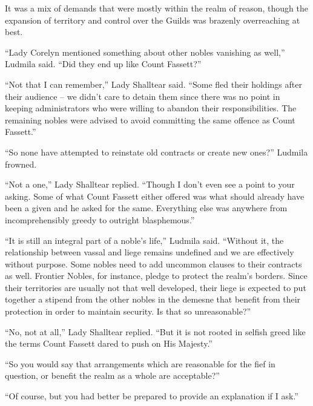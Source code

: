  

It was a mix of demands that were mostly within the realm of reason, though the expansion of territory and control over the Guilds was brazenly overreaching at best.

 

“Lady Corelyn mentioned something about other nobles vanishing as well,” Ludmila said. “Did they end up like Count Fassett?”

 

“Not that I can remember,” Lady Shalltear said. “Some fled their holdings after their audience – we didn’t care to detain them since there was no point in keeping administrators who were willing to abandon their responsibilities. The remaining nobles were advised to avoid committing the same offence as Count Fassett.”

 

“So none have attempted to reinstate old contracts or create new ones?” Ludmila frowned.

 

“Not a one,” Lady Shalltear replied. “Though I don’t even see a point to your asking. Some of what Count Fassett either offered was what should already have been a given and he asked for the same. Everything else was anywhere from incomprehensibly greedy to outright blasphemous.”

 

“It is still an integral part of a noble’s life,” Ludmila said. “Without it, the relationship between vassal and liege remains undefined and we are effectively without purpose. Some nobles need to add uncommon clauses to their contracts as well. Frontier Nobles, for instance, pledge to protect the realm’s borders. Since their territories are usually not that well developed, their liege is expected to put together a stipend from the other nobles in the demesne that benefit from their protection in order to maintain security. Is that so unreasonable?”

 

“No, not at all,” Lady Shalltear replied. “But it is not rooted in selfish greed like the terms Count Fassett dared to push on His Majesty.”

 

“So you would say that arrangements which are reasonable for the fief in question, or benefit the realm as a whole are acceptable?”

 

“Of course, but you had better be prepared to provide an explanation if I ask.”

